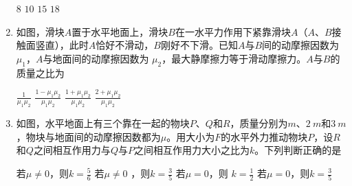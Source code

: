 \begin{enumerate}[leftmargin=0em]
\fourchoices
{$ 8 $}
{$ 10 $}
{$ 15 $}
{$ 18 $}


\item
{}
如图，滑块$ A $置于水平地面上，滑块$ B $在一水平力作用下紧靠滑块$ A $（$ A $、$ B $接触面竖直），此时$ A $恰好不滑动，$ B $刚好不下滑。已知$ A $与$ B $间的动摩擦因数为$ \mu _1 $，$ A $与地面间的动摩擦因数为
$ \mu _2 $，最大静摩擦力等于滑动摩擦力。$ A $与$ B $的质量之比为 
\begin{figure}[h!]
\centering

\end{figure}

\fourchoices
{$ \frac { 1 } { \mu _ { 1 } \mu _ { 2 } } $}
{$ \frac { 1 - \mu _ { 1 } \mu _ { 2 } } { \mu _ { 1 } \mu _ { 2 } } $}
{$ \frac { 1 + \mu _ { 1 } \mu _ { 2 } } { \mu _ { 1 } \mu _ { 2 } } $}
{$ \frac { 2 + \mu _ { 1 } \mu _ { 2 } } { \mu _ { 1 } \mu _ { 2 } } $}



\item
{}
如图，水平地面上有三个靠在一起的物块$ P $、$ Q $和$ R $，质量分别为$ m $、$ 2 \ m $和$ 3 \ m $，物块与地面间的动摩擦因数都为$ \mu $。用大小为$ F $的水平外力推动物块$ P $，设$ R $和$ Q $之间相互作用力与$ Q $与$ P $之间相互作用力大小之比为$ k $。下列判断正确的是 
\begin{figure}[h!]
\centering

\end{figure}

\fourchoices
{若$ \mu \neq 0 $，则$ k= \frac{ 5 }{ 6 } $ }
{若$ \mu \neq 0 $ ，则$ k= \frac{ 3 }{ 5 } $}
{若$ \mu =0 $，则 $ k= \frac{ 1 }{ 2 } $}
{若$ \mu =0 $，则$ k= \frac{ 3 }{ 5 } $}








\end{enumerate}



